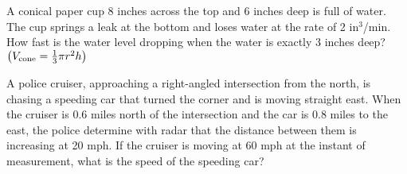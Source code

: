 \documentclass[12pt]{article}
\begin{document}
\newpage 

\Example A conical paper cup 8 inches across the top and 6 inches deep is full of water. The cup springs a leak at the bottom and loses water at the rate of 2 in$^3$/min. How fast is the water level dropping when the water is exactly 3 inches deep? $\left( V_{\text{cone}}=\frac{1}{3}\pi r^2h\right)$

\vspace{90mm}

\Example A police cruiser, approaching a right-angled intersection from the north, is chasing a speeding car that turned the corner and is moving straight east. When the cruiser is 0.6 miles north of the intersection and the car is 0.8 miles to the east, the police determine with radar that the distance between them is increasing at 20 mph. If the cruiser is moving at 60 mph at the instant of measurement, what is the speed of the speeding car?
\end{document}
